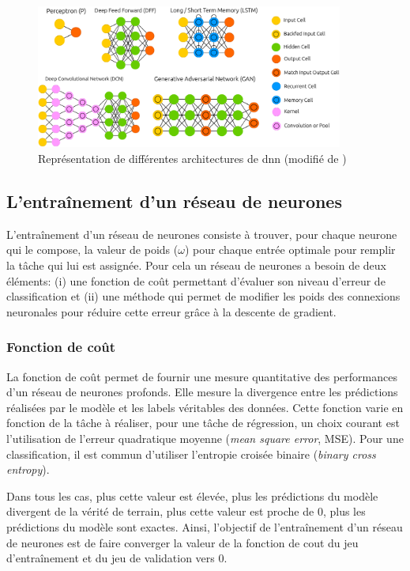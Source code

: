 \begin{figure}[!ht]
 \centering
 \includegraphics[width=0.9\textwidth]{figures/dnn_archi.png}
 \caption[Représentation de différentes architectures de \gls{dnn}]{Représentation de différentes architectures de \gls{dnn} (modifié de \cite{leijnen_neural_2016})}
 \label{fig:dnn_archi}
\end{figure}


\subsection{L'entraînement d'un réseau de neurones}
L'entraînement d'un réseau de neurones consiste à trouver, pour chaque neurone qui le compose, la valeur de poids ($\omega$) pour chaque entrée optimale pour remplir la tâche qui lui est assignée. Pour cela un réseau de neurones a besoin de deux éléments: (i) une fonction de coût permettant d'évaluer son niveau d'erreur de classification et (ii) une méthode qui permet de modifier les poids des connexions neuronales pour réduire cette erreur grâce à la descente de gradient.

\subsubsection{Fonction de coût}
La fonction de coût permet de fournir une mesure quantitative des performances d'un réseau de neurones profonds. Elle mesure la divergence entre les prédictions réalisées par le modèle et les labels véritables des données. Cette fonction varie en fonction de la tâche à réaliser, pour une tâche de régression, un choix courant est l'utilisation de l'erreur quadratique moyenne (\textit{mean square error}, MSE). Pour une classification, il est commun d'utiliser l'entropie croisée binaire (\textit{binary cross entropy}). 


Dans tous les cas, plus cette valeur est élevée, plus les prédictions du modèle divergent de la vérité de terrain, plus cette valeur est proche de 0, plus les prédictions du modèle sont exactes. Ainsi, l'objectif de l'entraînement d'un réseau de neurones est de faire converger la valeur de la fonction de cout du jeu d'entraînement et du jeu de validation vers 0. 


